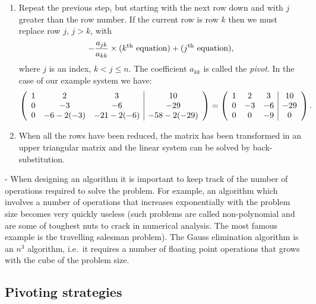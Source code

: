 \begin{enumerate}
\item Repeat the previous step, but starting with the next row down
and with $j$ greater than the row number.   If the current row is row
$k$ then we must replace row $j$, $j > k$, with
%
%
\begin{equation*}
   -\frac{a_{j k}}{a_{k k}} \times ( k^{\rm th} \text{ equation} ) +
   ( j^{\rm th}\text{ equation} ) ,
 \end{equation*}
%
where $j$ is an index, $k < j \le n$.    The coefficient $a_{k k}$ is
called the \textit{pivot}. In the case of our example system we have:
%
\begin{equation*}
  \left (
  \begin{array}{c c c|c}
   1 & 2 & 3 & 10 \\ 
   0 & -3 & -6 & -29 \\ 
   0 & -6 - 2 (-3) & -21 - 2 (-6) & -58 - 2 (-29)
  \end{array}
 \right ) =
 \left (
  \begin{array}{c c c|c}
   1 & 2 & 3 & 10 \\ 
   0 & -3 & -6 & -29 \\  
   0 & 0 & -9 & 0
  \end{array}
 \right ) .
\end{equation*}


\item When all the rows have been reduced, the matrix has been
transformed in an upper triangular matrix and the linear system can be
solved by back-substitution.

\end{enumerate}

 - When designing an algorithm it is important
to keep track of the number of operations required to solve the
problem.   For example, an algorithm which involves a number of
operations that increases exponentially with the problem size becomes
very quickly useless (such problems are called non-polynomial and are
some of toughest nuts to crack in numerical analysis.  The most famous
example is the travelling salesman problem).    The Gauss elimination
algorithm is an $n^3$ algorithm, i.e.\ it requires a number of floating
point operations that grows with the cube of the problem size.

\subsection{Pivoting strategies}


